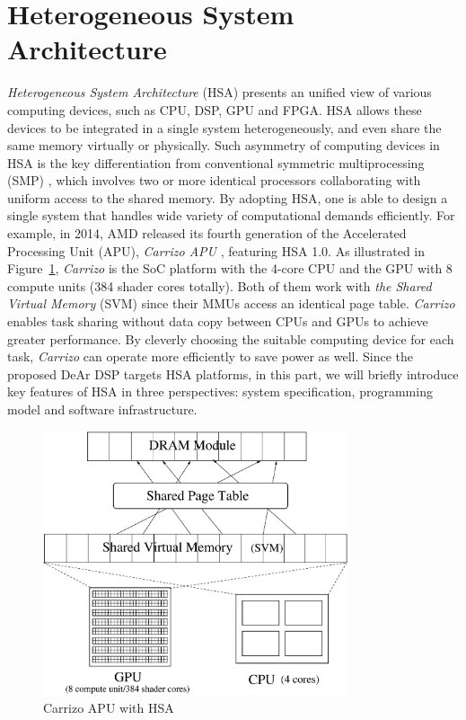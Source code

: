     \section{Heterogeneous System Architecture}
    \textit{Heterogeneous System Architecture} (HSA) presents an unified view of various computing devices, 
    such as CPU, DSP, GPU and FPGA.
    HSA allows these devices to be integrated in a single system heterogeneously, and even share the same memory virtually or physically.
    Such asymmetry of computing devices in HSA is the key differentiation from conventional symmetric multiprocessing (SMP) \cite{parallel},
    which involves two or more identical processors collaborating with uniform access to the shared memory.
    By adopting HSA, one is able to design a single system that handles wide variety of computational demands efficiently.
    For example, in 2014, AMD released its fourth generation of the Accelerated Processing Unit (APU), \textit{Carrizo APU} \cite{carrizo}, featuring HSA 1.0.
    As illustrated in Figure~\ref{fig:carrizo}, \textit{Carrizo} is the SoC platform with the 4-core CPU and the GPU with 8 compute units (384 shader cores totally).
    Both of them work with \textit{the Shared Virtual Memory} (SVM) since their MMUs access an identical page table.
    \textit{Carrizo} enables task sharing without data copy between CPUs and GPUs to achieve greater performance.
    By cleverly choosing the suitable computing device for each task, 
    \textit{Carrizo} can operate more efficiently to save power as well.
    Since the proposed DeAr DSP targets HSA platforms, 
    in this part, we will briefly introduce key features of HSA in three perspectives: 
    system specification, programming model and software infrastructure.
        \vspace{\textfig}
        \begin{figure}[!ht] 
            \centering
            \includegraphics[width=0.8\textwidth]{./figs/carrizo.eps}
            \caption{Carrizo APU with HSA}
            \label{fig:carrizo}
        \end{figure}
